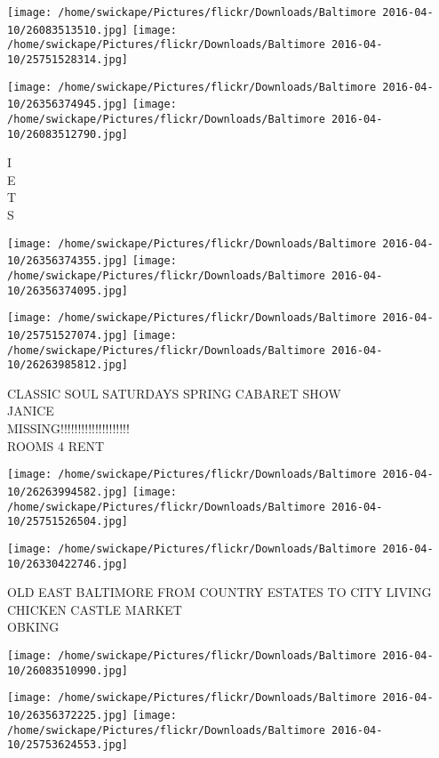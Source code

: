 \documentclass[10pt,letterpaper]{article}
\begin{document}
\texttt{[image: /home/swickape/Pictures/flickr/Downloads/Baltimore 2016-04-10/26083513510.jpg]}
\texttt{[image: /home/swickape/Pictures/flickr/Downloads/Baltimore 2016-04-10/25751528314.jpg]}

\texttt{[image: /home/swickape/Pictures/flickr/Downloads/Baltimore 2016-04-10/26356374945.jpg]}
\texttt{[image: /home/swickape/Pictures/flickr/Downloads/Baltimore 2016-04-10/26083512790.jpg]}

I\\
E\\
T\\
S\\
\pagebreak

\texttt{[image: /home/swickape/Pictures/flickr/Downloads/Baltimore 2016-04-10/26356374355.jpg]}
\texttt{[image: /home/swickape/Pictures/flickr/Downloads/Baltimore 2016-04-10/26356374095.jpg]}

\texttt{[image: /home/swickape/Pictures/flickr/Downloads/Baltimore 2016-04-10/25751527074.jpg]}
\texttt{[image: /home/swickape/Pictures/flickr/Downloads/Baltimore 2016-04-10/26263985812.jpg]}

CLASSIC SOUL SATURDAYS SPRING CABARET SHOW\\
JANICE\\
MISSING!!!!!!!!!!!!!!!!!!!!\\
ROOMS 4 RENT\\
\pagebreak

\texttt{[image: /home/swickape/Pictures/flickr/Downloads/Baltimore 2016-04-10/26263994582.jpg]}
\texttt{[image: /home/swickape/Pictures/flickr/Downloads/Baltimore 2016-04-10/25751526504.jpg]}

\texttt{[image: /home/swickape/Pictures/flickr/Downloads/Baltimore 2016-04-10/26330422746.jpg]}

OLD EAST BALTIMORE FROM COUNTRY ESTATES TO CITY LIVING\\
CHICKEN CASTLE MARKET\\
OBKING\\
\pagebreak

\texttt{[image: /home/swickape/Pictures/flickr/Downloads/Baltimore 2016-04-10/26083510990.jpg]}

\vspace{0.25in}
\texttt{[image: /home/swickape/Pictures/flickr/Downloads/Baltimore 2016-04-10/26356372225.jpg]}
\texttt{[image: /home/swickape/Pictures/flickr/Downloads/Baltimore 2016-04-10/25753624553.jpg]}
\end{document}
